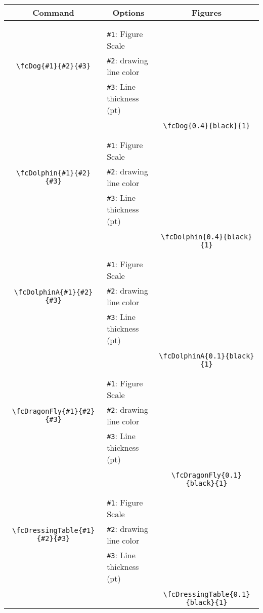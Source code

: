 \documentclass[x11names]{article}
\begin{document}
\begin{table}[H]\centering\begin{tabular}{|c|l|c|}\hline {\bf Command}& \multicolumn{1}{c|}{{\bf Options}} & {\bf Figures}\\  \hline	&&\multirow{5}{*}{\fcDog{0.4}{black}{1}}\\	&&\\	&\verb|#1|: Figure Scale &\\	\verb|\fcDog{#1}{#2}{#3}|&	\verb|#2|: drawing line color &\\	&\verb|#3|: Line thickness (pt) &\\ &&\\&&	\verb|\fcDog{0.4}{black}{1}|\\\hline 	
	&&\multirow{5}{*}{\fcDolphin{0.4}{black}{1}}\\	&&\\	&\verb|#1|: Figure Scale &\\	\verb|\fcDolphin{#1}{#2}{#3}|&	\verb|#2|: drawing line color &\\	&\verb|#3|: Line thickness (pt) &\\ &&\\&&	\verb|\fcDolphin{0.4}{black}{1}|\\\hline 	
	&&\multirow{5}{*}{\fcDolphinA{0.1}{black}{1}}\\	&&\\	&\verb|#1|: Figure Scale &\\	\verb|\fcDolphinA{#1}{#2}{#3}|&	\verb|#2|: drawing line color &\\	&\verb|#3|: Line thickness (pt) &\\ &&\\&&	\verb|\fcDolphinA{0.1}{black}{1}|\\\hline 	
	&&\multirow{5}{*}{\fcDragonFly{0.1}{black}{1}}\\	&&\\	&\verb|#1|: Figure Scale &\\	\verb|\fcDragonFly{#1}{#2}{#3}|&	\verb|#2|: drawing line color &\\	&\verb|#3|: Line thickness (pt) &\\ &&\\&&	\verb|\fcDragonFly{0.1}{black}{1}|\\\hline 	
	&&\multirow{5}{*}{\fcDressingTable{0.1}{black}{1}}\\	&&\\	&\verb|#1|: Figure Scale &\\	\verb|\fcDressingTable{#1}{#2}{#3}|&	\verb|#2|: drawing line color &\\	&\verb|#3|: Line thickness (pt) &\\ &&\\&&	\verb|\fcDressingTable{0.1}{black}{1}|\\\hline 	

\end{tabular}
\end{table}
\end{document}
